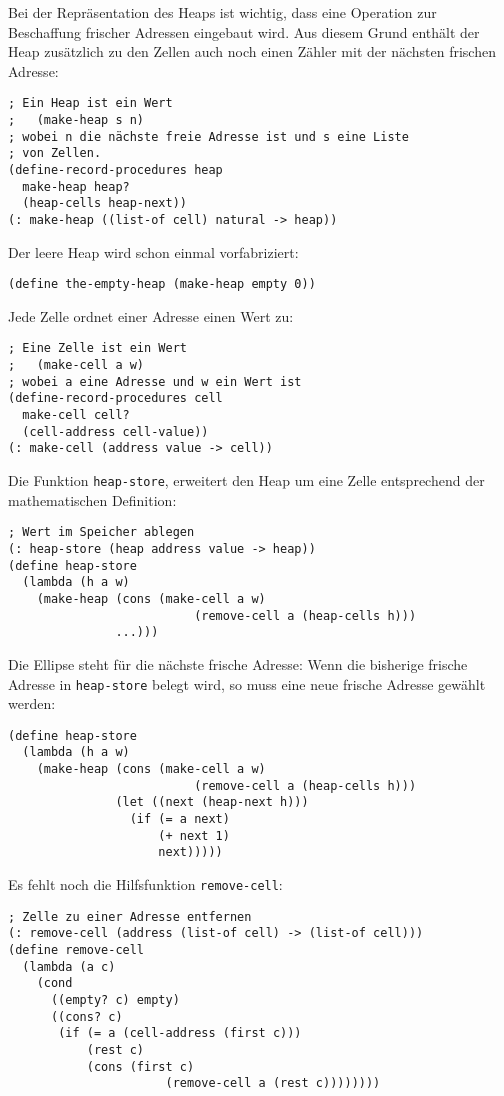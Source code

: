 %
Bei der Repräsentation des Heaps ist wichtig, dass eine Operation zur
Beschaffung frischer Adressen eingebaut wird.  Aus diesem Grund
enthält der Heap zusätzlich zu den Zellen auch noch einen Zähler mit
der nächsten frischen Adresse:
%
\begin{verbatim}
; Ein Heap ist ein Wert
;   (make-heap s n)
; wobei n die nächste freie Adresse ist und s eine Liste
; von Zellen.
(define-record-procedures heap
  make-heap heap?
  (heap-cells heap-next))
(: make-heap ((list-of cell) natural -> heap))
\end{verbatim}
%
Der leere Heap wird schon einmal vorfabriziert:
%
\begin{verbatim}
(define the-empty-heap (make-heap empty 0))
\end{verbatim}
%
Jede Zelle ordnet einer Adresse einen Wert zu:
%
\begin{verbatim}
; Eine Zelle ist ein Wert
;   (make-cell a w)
; wobei a eine Adresse und w ein Wert ist
(define-record-procedures cell
  make-cell cell?
  (cell-address cell-value))
(: make-cell (address value -> cell))
\end{verbatim}
%
Die Funktion \texttt{heap-store}, erweitert den Heap um eine Zelle
entsprechend der mathematischen Definition:
%
\begin{verbatim}
; Wert im Speicher ablegen
(: heap-store (heap address value -> heap))
(define heap-store
  (lambda (h a w)
    (make-heap (cons (make-cell a w)
                          (remove-cell a (heap-cells h)))
               ...)))
\end{verbatim}
%
Die Ellipse steht für die nächste frische Adresse: Wenn die bisherige
frische Adresse in \texttt{heap-store} belegt wird, so muss eine neue
frische Adresse gewählt werden:
%
\begin{verbatim}
(define heap-store
  (lambda (h a w)
    (make-heap (cons (make-cell a w)
                          (remove-cell a (heap-cells h)))
               (let ((next (heap-next h)))
                 (if (= a next)
                     (+ next 1)
                     next)))))
\end{verbatim}
%
Es fehlt noch die Hilfsfunktion \texttt{remove-cell}:
%
\begin{verbatim}
; Zelle zu einer Adresse entfernen
(: remove-cell (address (list-of cell) -> (list-of cell)))
(define remove-cell
  (lambda (a c)
    (cond
      ((empty? c) empty)
      ((cons? c)
       (if (= a (cell-address (first c)))
           (rest c)
           (cons (first c)
                      (remove-cell a (rest c))))))))
\end{verbatim}

